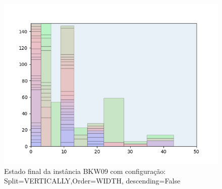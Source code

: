 \begin{figure}[H]
    \centering
    \caption[]{Estado final da instância BKW09 com configuração: Split=VERTICALLY,Order=WIDTH, descending=False}
    \label{fig:bkw09-vertically-width-false}
    \includegraphics[scale=0.5]{output/figures/bkw/bkw09/vertically/width/false/000}
\end{figure}